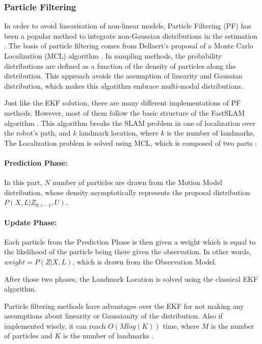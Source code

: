 \documentclass[11pt]{article}
\begin{document}
	\subsubsection{Particle Filtering}

In order to avoid linearisation of non-linear models, Particle Filtering (PF) has been a popular method to integrate non-Gaussian distributions in the estimation \cite{Montemerlo02fastslam:a}\cite{772544}. The basis of particle filtering comes from Dellaert's proposal of a Monte Carlo Localization (MCL) algorithm \cite{772544}. In sampling methods, the probability distributions are defined as a function of the density of particles along the distribution. This approach avoids the assumption of linearity and Gaussian distribution, which makes this algorithm embrace multi-modal distributions.
	
Just like the EKF solution, there are many different implementations of PF methods. However, most of them follow the basic structure of the FastSLAM algorithm \cite{Montemerlo02fastslam:a}. This algorithm breaks the SLAM problem in one of localization over the robot's path, and $k$ landmark location, where $k$ is the number of landmarks. The Localization problem is solved using MCL, which is composed of two parts \cite{772544}:
	 
\paragraph{Prediction Phase:} In this part, $N$ number of particles are drawn from the Motion Model distribution, whose density asymptotically represents the proposal distribution $P(X, L | Z_{0:i-1}, U)$.
	 
\paragraph{Update Phase:} Each particle from the Prediction Phase is then given a weight which is equal to the likelihood of the particle being there given the observation. In other words, $weight = P(Z|X, L)$, which is drawn from the Observation Model.
	 
After those two phases, the Landmark Location is solved using the classical EKF algorithm.
	 
Particle filtering methods have advantages over the EKF for not making any assumptions about linearity or Gaussianity of the distribution. Also if implemented wisely, it can reach $O(Mlog(K))$ time, where $M$ is the number of particles and $K$ is the number of landmarks \cite{Montemerlo02fastslam:a}.
	 
\end{document}
